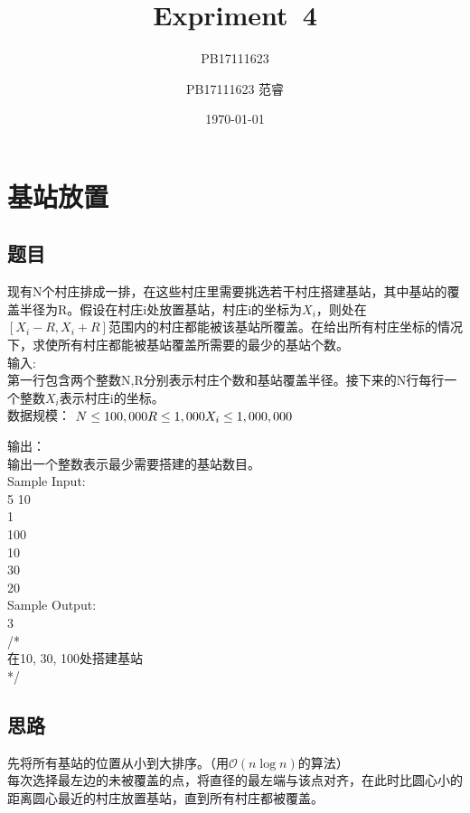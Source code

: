 \documentclass[UTF8]{ctexart}
\title{Expriment\ 4}
\author{PB17111623}
\author{PB17111623 范睿}
\date{\today}
\begin{document}
\maketitle
\section{基站放置}
\subsection{题目}
现有N个村庄排成一排，在这些村庄里需要挑选若干村庄搭建基站，其中基站的覆盖半径为R。假设在村庄i处放置基站，村庄i的坐标为$X_i$，则处在$[X_i-R,X_i+R]$范围内的村庄都能被该基站所覆盖。在给出所有村庄坐标的情况下，求使所有村庄都能被基站覆盖所需要的最少的基站个数。\\

输入:\\
第一行包含两个整数N,R分别表示村庄个数和基站覆盖半径。接下来的N行每行一个整数$X_i$表示村庄i的坐标。\\

数据规模：
$N\leq 100,000\\
R\leq 1,000\\
X_i \leq 1,000,000\\$

输出：\\
输出一个整数表示最少需要搭建的基站数目。\\

Sample Input:\\ 
5 10\\
1\\
100\\
10\\
30\\
20\\


Sample Output:\\
3\\
/*\\
在10, 30, 100处搭建基站\\
*/\\

\subsection{思路}
先将所有基站的位置从小到大排序。（用$\mathcal{O}(n\log n)$的算法）\\
每次选择最左边的未被覆盖的点，将直径的最左端与该点对齐，在此时比圆心小的距离圆心最近的村庄放置基站，直到所有村庄都被覆盖。
\end{document}
